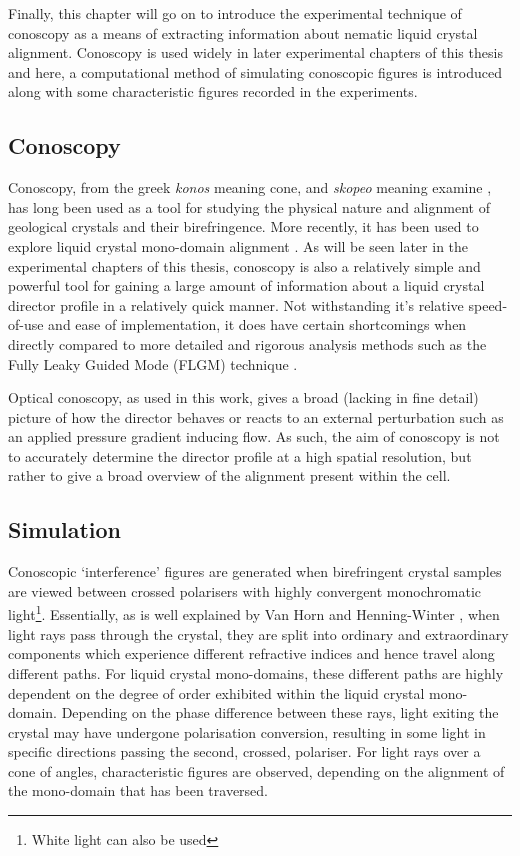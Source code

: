 Finally, this chapter will go on to introduce the experimental technique of conoscopy as a means of extracting information about nematic liquid crystal alignment. Conoscopy is used widely in later experimental chapters of this thesis and here, a computational method of simulating conoscopic figures is introduced along with some characteristic figures recorded in the experiments.

\newpage
\subsection{Conoscopy}
Conoscopy, from the greek \textit{konos} meaning cone, and \textit{skopeo} meaning examine \cite{wikipedia}, has long been used as a tool for studying the physical nature and alignment of geological crystals and their birefringence. More recently, it has been used to explore liquid crystal mono-domain alignment \cite{Horn2001}. As will be seen later in the experimental chapters of this thesis, conoscopy is also a relatively simple and powerful tool for gaining a large amount of information about a liquid crystal director profile in a relatively quick manner. Not withstanding it's relative speed-of-use and ease of implementation, it does have certain shortcomings when directly compared to more detailed and rigorous analysis methods such as the Fully Leaky Guided Mode (FLGM) technique \cite{Cornford2009,Yang2007,Jewell2005a,Jewell2006,Jewell2007}.

Optical conoscopy, as used in this work, gives a broad (lacking in fine detail) picture of how the director behaves or reacts to an external perturbation such as an applied pressure gradient inducing flow. As such, the aim of conoscopy is not to accurately determine the director profile at a high spatial resolution, but rather to give a broad overview of the alignment present within the cell.

\subsection{Simulation}
Conoscopic `interference' figures are generated when birefringent crystal samples are viewed between crossed polarisers with highly convergent monochromatic light\footnote{White light can also be used}. Essentially, as is well explained by Van Horn and Henning-Winter \cite{Horn2001}, when light rays pass through the crystal, they are split into ordinary and extraordinary components which experience different refractive indices and hence travel along different paths. For liquid crystal mono-domains, these different paths are highly dependent on the degree of order exhibited within the liquid crystal mono-domain. Depending on the phase difference between these rays, light exiting the crystal may have undergone polarisation conversion, resulting in some light in specific directions passing the second, crossed, polariser. For light rays over a cone of angles, characteristic figures are observed, depending on the alignment of the mono-domain that has been traversed.

